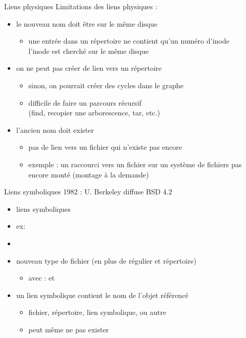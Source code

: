 \begin {frame} {Liens physiques}
    Limitations des liens physiques :
    \begin {itemize}
	\item le nouveau nom doit être sur le même disque
	    \begin {itemize}
		\item une entrée dans un répertoire ne contient
		    qu'un numéro d'inode \\
		    \implique l'inode est cherché sur le même disque
	    \end {itemize}
	\item on ne peut pas créer de lien vers un répertoire
	    \begin {itemize}
		\item sinon, on pourrait créer des cycles dans le graphe
		\item difficile de faire un parcours récursif \\
		    (find, recopier une arborescence, tar, etc.)
	    \end {itemize}
	\item l'ancien nom doit exister
	    \begin {itemize}
		\item pas de lien vers un fichier qui n'existe pas encore
		\item exemple : un raccourci vers un fichier sur un
		    système de fichiers pas encore monté (montage à
		    la demande)

	    \end {itemize}
    \end {itemize}
\end {frame}

\begin {frame} {Liens symboliques}
    1982 : U. Berkeley diffuse BSD 4.2

    \begin {itemize}
	\item liens symboliques
	\item ex: 
	\item {}
	\item nouveau type de fichier (en plus de régulier et répertoire)
	    \begin {itemize}
		\item avec  :  et
	    \end {itemize}
	\item un lien symbolique contient le nom de l'objet référencé
	    \begin {itemize}
		\item fichier, répertoire, lien symbolique, ou autre
		\item peut même ne pas exister
	    \end {itemize}
    \end {itemize}
\end {frame}

